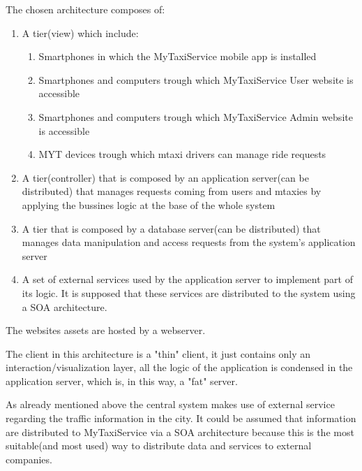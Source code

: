\documentclass[11pt,titlepage]{article} %
\begin{document}
        The chosen architecture composes of:
         \begin{enumerate}
	          \item A tier(view) which include:
		\begin{enumerate}
		            \item Smartphones in which the MyTaxiService mobile app is installed
		            \item Smartphones and computers trough which MyTaxiService User website is accessible
		            \item Smartphones and computers trough which MyTaxiService Admin website is accessible
		            \item MYT devices trough which mtaxi drivers can manage ride requests
		\end{enumerate}

	          \item A tier(controller) that is composed by an application server(can be distributed) that manages requests coming from users
	          and mtaxies by applying the bussines logic at the base of the whole system
	          \item A tier that is composed by a database server(can be distributed) that manages data manipulation and access requests from
	          the system's application server
	          \item A set of external services used by the application server to implement part of its logic. It is supposed that these
	          services are distributed to the system using a SOA architecture.
	\end{enumerate}
	The websites assets are hosted by a webserver.\newline

        The client in this architecture is a "thin" client, it just contains only an interaction/visualization layer, all
        the logic of the application is condensed in the application server, which is, in this way, a "fat" server.\newline


        As already mentioned above the central system makes use of external service regarding the traffic information in the
        city. It could be assumed that information are distributed to MyTaxiService via a SOA architecture because this is
        the most suitable(and most used) way to distribute data and services to external companies.\newline
\end{document}
